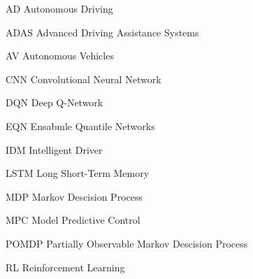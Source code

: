 \begin{acronyms}
\item[AD] Autonomous Driving %
\item[ADAS] Advanced Driving Assistance Systems %
\item[AV] Autonomous Vehicles %
\item[CNN] Convolutional Neural Network %
\item[DQN] Deep Q-Network %
\item[EQN] Ensabmle Quantile Networks %
\item[IDM] Intelligent Driver %
\item[LSTM] Long Short-Term Memory %
\item[MDP] Markov Descision Process %
\item[MPC] Model Predictive Control %
\item[POMDP] Partially Observable Markov Descision Process %
\item[RL] Reinforcement Learning %

\end{acronyms}





